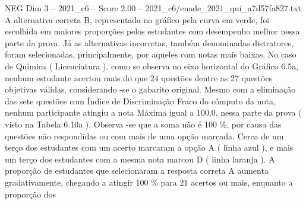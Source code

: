 \begin{textsample}{NEG Dim 3 – 2021\_c6 – Score 2.00 – 2021\_c6/enade\_2021\_qui\_a7d57fa827.txt}
A alternativa correta B, representada no gráfico pela curva em verde, foi escolhida em maiores proporções pelos estudantes com desempenho melhor nessa parte da prova.
Já as alternativas incorretas, também denominadas distratores, foram selecionadas, principalmente, por aqueles com notas mais baixas.
No caso de Química ( Licenciatura ), como se observa no eixo horizontal do Gráfico 6.5a, nenhum estudante acertou mais do que 24 questões dentre as 27 questões objetivas válidas, considerando -se o gabarito original.
Mesmo com a eliminação das sete questões com Índice de Discriminação Fraco do cômputo da nota, nenhum participante atingiu a nota Máxima igual a 100,0, nessa parte da prova ( visto na Tabela 6.10a ).
Observa -se que a soma não é 100 \%, por causa das questões não respondidas ou com mais de uma opção marcada.
Cerca de um terço dos estudantes com um acerto marcaram a opção A ( linha azul ), e mais um terço dos estudantes com a mesma nota marcou D ( linha laranja ).
A proporção de estudantes que selecionaram a resposta correta A aumenta gradativamente, chegando a atingir 100 \% para 21 acertos ou mais, enquanto a proporção dos

\end{textsample}
